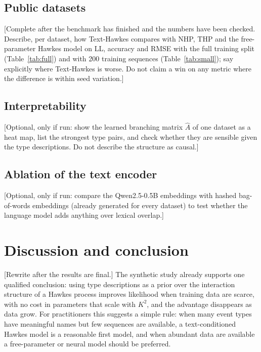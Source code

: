 \documentclass[preprint,12pt,authoryear]{elsarticle}
\newcommand{\todo}[1]{{\color{red}[#1]}}
\begin{document}
\subsection{Public datasets}

\todo{Complete after the benchmark has finished and the numbers have been checked. Describe, per dataset, how Text-Hawkes compares with NHP, THP and the free-parameter Hawkes model on LL, accuracy and RMSE with the full training split (Table~\ref{tab:full}) and with 200 training sequences (Table~\ref{tab:small}); say explicitly where Text-Hawkes is worse. Do not claim a win on any metric where the difference is within seed variation.}




\subsection{Interpretability}

\todo{Optional, only if run: show the learned branching matrix $\hat A$ of one dataset as a heat map, list the strongest type pairs, and check whether they are sensible given the type descriptions. Do not describe the structure as causal.}

\subsection{Ablation of the text encoder}

\todo{Optional, only if run: compare the Qwen2.5-0.5B embeddings with hashed bag-of-words embeddings (already generated for every dataset) to test whether the language model adds anything over lexical overlap.}

\section{Discussion and conclusion}
\label{sec:conclusion}

\todo{Rewrite after the results are final.} The synthetic study already supports one qualified conclusion: using type descriptions as a prior over the interaction structure of a Hawkes process improves likelihood when training data are scarce, with no cost in parameters that scale with $K^2$, and the advantage disappears as data grow. For practitioners this suggests a simple rule: when many event types have meaningful names but few sequences are available, a text-conditioned Hawkes model is a reasonable first model, and when abundant data are available a free-parameter or neural model should be preferred.
\end{document}
